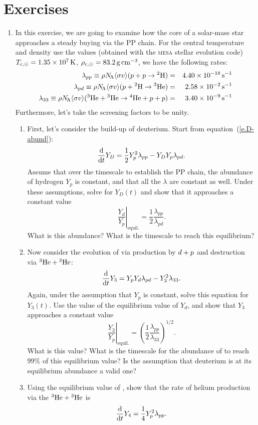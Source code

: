 \section{Exercises}
\begin{enumerate}
\item In this exercise, we are going to examine how the core of a solar-mass star approaches a steady buying via the PP chain.  For the central temperature and density use the values (obtained with the \textsc{mesa} stellar evolution code) $T_{c,\odot} = 1.35\ee{7}\nsp\K$, $\rho_{c,\odot} = 83.2\nsp\grampercc$, we have the following rates:
\begin{eqnarray*}
\lambda_{pp} \equiv \rho\NA\langle\sigma v\rangle(\pt+\pt \to \hydrogen[2]) &=& 4.40\ee{-18}\nsp\second^{-1} \\
\lambda_{pd} \equiv \rho\NA\langle\sigma v\rangle(\pt+\hydrogen[2] \to \helium[3])&=& 2.58\ee{-2}\nsp\second^{-1}\\
\lambda_{33} \equiv \rho\NA\langle\sigma v\rangle(\helium[3]+\helium[3]\to\helium[4]+\pt+\pt) &=& 3.40\ee{-9}\nsp\second^{-1}
\end{eqnarray*}
Furthermore, let's take the screening factors to be unity.
\begin{enumerate}
\item First, let's consider the build-up of deuterium. Start from equation~(\ref{e.D-abund}):
\begin{equation}
\frac{\dif}{\dif t} Y_{D} = \frac{1}{2}Y_{p}^{2}\lambda_{pp} - Y_{D}Y_{p}\lambda_{pd}.
\end{equation}
Assume that over the timescale to establish the PP chain, the abundance of hydrogen $Y_{p}$ is constant, and that all the $\lambda$ are constant as well. Under these assumptions, solve for $Y_{D}(t)$ and show that it approaches a constant value
\[ \left.\frac{Y_{d}}{Y_{p}}\right|_{\mathrm{equil.}} = \frac{1}{2}\frac{\lambda_{pp}}{\lambda_{pd}}. \]
What is this abundance? What is the timescale to reach this equilibrium?

\item Now consider the evolution of \helium[3] via production by $d+\pt$ and destruction via $\helium[3]+\helium[3]$:
\begin{equation}
\frac{\dif}{\dif t}Y_{3} = Y_{p}Y_{d}\lambda_{pd} - Y_{3}^{2}\lambda_{33}.
\end{equation}
Again, under the assumption that $Y_{p}$ is constant, solve this equation for $Y_{3}(t)$. Use the value of the equilibrium value of $Y_{d}$, and show that $Y_{3}$ approaches a constant value
\[ \left.\frac{Y_{3}}{Y_{p}}\right|_{\mathrm{equil.}} = \left(\frac{1}{2}\frac{\lambda_{pp}}{\lambda_{33}}\right)^{1/2}. \]
What is this value? What is the timescale for the abundance of \helium[3] to reach 99\% of this equilibrium value? Is the assumption that deuterium is at its equilibrium abundance a valid one?
\item Using the equilibrium value of \helium[3], show that the rate of helium production via the $\helium[3]+\helium[3]$ is
\[ \frac{\dif}{\dif t}Y_{4} = \frac{1}{4}Y_{p}^{2}\lambda_{pp}. \]

\end{enumerate}
\end{enumerate}
